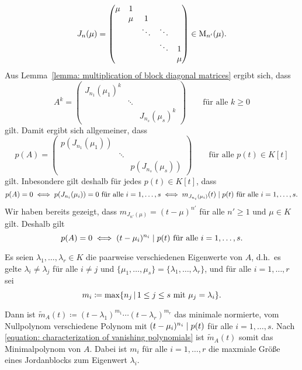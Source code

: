 \documentclass[a4paper,10pt]{scrartcl}
\begin{document}
\begin{itemize}
    \[
        J_n(\mu)
      = \begin{pmatrix}
          \mu & 1   &         &         &         \\
              & \mu & 1       &         &         \\
              &     & \ddots  & \ddots  &         \\
              &     &         & \ddots  & 1       \\
              &     &         &         & \mu
        \end{pmatrix}
        \in \operatorname{M}_{n'}(\mu).
    \]
    Aus Lemma~\ref{lemma: multiplication of block diagonal matrices} ergibt sich, dass
    \[
        A^k
      = \begin{pmatrix}
          J_{n_1}(\mu_1)^k  &         &                   \\
                            & \ddots  &                   \\
                            &         & J_{n_s}(\mu_s)^k
        \end{pmatrix}
      \qquad
      \text{für alle $k \geq 0$}
    \]
    gilt. Damit ergibt sich allgemeiner, dass
    \[
        p(A)
      = \begin{pmatrix}
          p( J_{n_1}(\mu_1) ) &         &                     \\
                              & \ddots  &                     \\
                              &         & p( J_{n_s}(\mu_s) )
        \end{pmatrix}
      \qquad
      \text{für alle $p(t) \in K[t]$}
    \]
    gilt.
    Inbesondere gilt deshalb für jedes $p(t) \in K[t]$, dass
    \[
            p(A) = 0
      \iff  \text{$p( J_{n_i}(\mu_i) ) = 0$ für alle $i = 1, \dotsc, s$}
      \iff  \text{$m_{ J_{n_i}(\mu_i) }(t) \mathrel{|} p(t)$ für alle $i = 1, \dotsc, s$}.
    \]
    Wir haben bereits gezeigt, dass $m_{J_{n'}(\mu)} = (t - \mu)^{n'}$ für alle $n' \geq 1$ und $\mu \in K$ gilt.
    Deshalb gilt
    \begin{equation}
      \label{equation: characterization of vanishing polynomials}
            p(A) = 0
      \iff  \text{$(t - \mu_i)^{n_i} \mathrel{|} p(t)$ für alle $i = 1, \dotsc, s$}.
    \end{equation}
    
    Es seien $\lambda_1, \dotsc, \lambda_r \in K$ die paarweise verschiedenen Eigenwerte von $A$, d.h.\ es gelte $\lambda_i \neq \lambda_j$ für alle $i \neq j$ und $\{\mu_1, \dotsc, \mu_s\} = \{\lambda_1, \dotsc, \lambda_r\}$, und für alle $i = 1, \dotsc, r$ sei
    \[
      m_i \coloneqq \max\{ n_j \,|\, \text{$1 \leq j \leq s$ mit $\mu_j = \lambda_i$} \}.
    \]
    
    Dann ist $\tilde{m}_A(t) \coloneqq (t - \lambda_1)^{m_1} \dotsb (t - \lambda_r)^{m_r}$ das minimale normierte, vom Nullpolynom verschiedene Polynom mit $(t - \mu_i)^{n_i} \mathrel{|} p(t)$ für alle $i = 1, \dotsc, s$.
    Nach \eqref{equation: characterization of vanishing polynomials} ist $\tilde{m}_A(t)$ somit das Minimalpolynom von $A$.
    Dabei ist $m_i$ für alle $i = 1, \dotsc, r$ die maxmiale Größe eines Jordanblocks zum Eigenwert $\lambda_i$.
\end{itemize}
\end{document}
